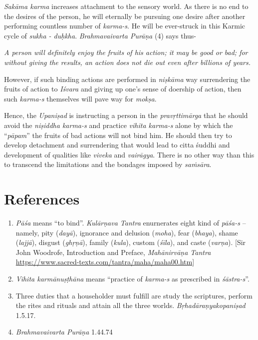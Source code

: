 \emph{Sakāma karma} increases attachment to the sensory world. As there is no end to the desires of the person, he will eternally be pursuing one desire after another performing countless number of \emph{karma-s}. He will be ever-struck in this Karmic cycle of \emph{sukha - duḥkha}. \emph{Brahmavaivarta Purāṇa} (4) says thus-

\emph{A person will definitely enjoy the fruits of his action; it may be good or bad; for without giving the results, an action does not die out even after billions of years.}

However, if such binding actions are performed in \emph{niṣkāma} way surrendering the fruits of action to \emph{Iśvara} and giving up one's sense of doership of action, then such \emph{karma-s} themselves will pave way for \emph{mokṣa}.

Hence, the \emph{Upaniṣad} is instructing a person in the \emph{pravṛttimārga} that he should avoid the \emph{niṣiddha karma-s} and practice \emph{vihita karma-s} alone by which the ``\emph{pāpam}'' the fruits of bad actions will not bind him. He should then try to develop detachment and surrendering that would lead to citta śuddhi and development of qualities like \emph{viveka} and \emph{vairāgya}. There is no other way than this to transcend the limitations and the bondages imposed by \emph{saṁsāra}.

\section*{References}

\begin{enumerate}
\itemsep=0pt
\item
  \emph{Pāśa} means ``to bind''. \emph{Kulārṇava Tantra} enurnerates eight kind of \emph{pāśa-s} -- namely, pity (\emph{dayā}), ignorance and delusion (\emph{moha}), fear (\emph{bhaya}), shame (\emph{lajjā}), disgust (\emph{ghṛṇā}), family (\emph{kula}), custom (\emph{śīla}), and caste (\emph{varṇa}). {[}Sir John Woodrofe, Introduction and Preface, \emph{Mahānirvāṇa Tantra} \url{https://www.sacred-texts.com/tantra/maha/maha00.htm}{]}
\item
  \emph{Vihita karmānuṣṭhāna} means ``practice of \emph{karma-s} as prescribed in \emph{śāstra-s}''.
\item
  Three duties that a householder must fulfill are study the scriptures, perform the rites and rituals and attain all the three worlds. \emph{Bṛhadāraṇyakopaniṣad} 1.5.17.
\item
  \emph{Brahmavaivarta Purāṇa} 1.44.74
\end{enumerate}
